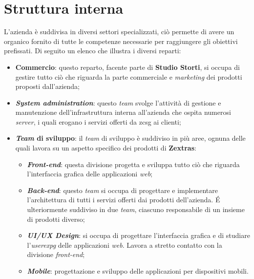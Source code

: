 \section{Struttura interna}
    L'azienda è suddivisa in diversi settori specializzati, ciò permette di avere un organico fornito di tutte le competenze necessarie per raggiungere gli obiettivi prefissati. Di seguito un elenco che illustra i diversi reparti:
    \begin{itemize}
        \item \textbf{Commercio}: questo reparto, facente parte di \textbf{Studio Storti}, si occupa di gestire tutto ciò che riguarda la parte commerciale e \textit{marketing} dei prodotti proposti dall'azienda;
        \item \textit{\textbf{System administration}}: questo \textit{team} svolge l'attività di gestione e manutenzione dell'infrastruttura interna all'azienda che ospita numerosi \textit{server}, i quali erogano i servizi offerti da \gls{zcsg} ai clienti;
        \item \textbf{\textit{Team} di sviluppo}:
            il \textit{team} di sviluppo è suddiviso in più aree, ognuna delle quali lavora su un aspetto specifico dei prodotti di \textbf{Zextras}:
            \begin{itemize}
                \item \textit{\textbf{Front-end}}: questa divisione progetta e sviluppa tutto ciò che riguarda l'interfaccia grafica delle applicazioni \textit{web};
                \item \textit{\textbf{Back-end}}: questo \textit{team} si occupa di progettare e implementare l'architettura di tutti i servizi offerti dai prodotti dell'azienda. \'E ulteriormente suddiviso in due \textit{team}, ciascuno responsabile di un insieme di prodotti diverso;
                \item \textit{\textbf{UI/UX Design}}: si occupa di progettare l'interfaccia grafica e di studiare l'\textit{\gls{userexpg}} delle applicazioni \textit{web}. Lavora a stretto contatto con la divisione \textit{front-end};
                \item \textit{\textbf{Mobile}}: progettazione e sviluppo delle applicazioni per dispositivi mobili.
            \end{itemize}
    \end{itemize}

\newpage

